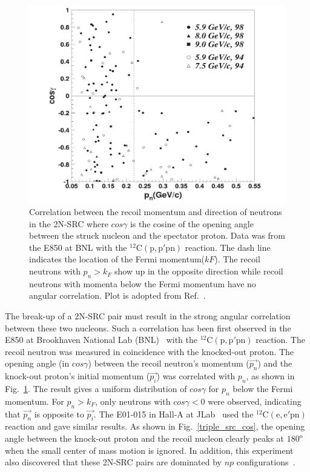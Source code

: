 \begin{figure}[!ht]
  \begin{center}
    \includegraphics[type=pdf,ext=.pdf,read=.pdf,width=0.65\linewidth]{./figures/physics/2NSRC_Angle}
    \caption[Correlation between the recoil momentum and direction of neutrons in the 2N-SRC]{\footnotesize{Correlation between the recoil momentum and direction of neutrons in the 2N-SRC where $cos\gamma$ is the cosine of the opening angle between the struck nucleon and the spectator proton. Data was from the E850 at BNL with the $\mathrm{^{12}C(p,p'pn)}$ reaction. The dash line indicates the location of the Fermi momentum($k{F}$). The recoil neutrons with $p_{n}>k_{F}$ show up in the opposite direction while recoil neutrons with momenta below the Fermi momentum have no angular correlation. Plot is adopted from Ref.~\cite{PhysRevLett.90.042301}.}}
    \label{bnl_cos}
  \end{center}
\end{figure}  
 The break-up of a 2N-SRC pair must result in the strong angular correlation between these two nucleons. Such a correlation has been first observed in the E850 at Brookhaven National Lab (BNL)~\cite{PhysRevLett.90.042301} with the $\mathrm{^{12}C(p,p'pn)}$ reaction. The recoil neutron was measured in coincidence with the knocked-out proton. The opening angle (in $cos\gamma$) between the recoil neutron's momentum ($\vec{p_{n}}$) and the knock-out proton's initial momentum ($\vec{p_{i}}$) was correlated with $p_{n}$, as shown in Fig.~\ref{bnl_cos}. The result gives a uniform distribution of $cos\gamma$ for $p_{n}$ below the Fermi momentum. For $p_{n}>k_{F}$, only neutrons with $cos\gamma<0$ were observed, indicating that $\vec{p_{n}}$ is opposite to $\vec{p_{i}}$. The E01-015 in Hall-A at JLab~\cite{PhysRevLett.99.072501} used the $\mathrm{^{12}C(e,e'pn)}$ reaction and gave similar results. As shown in Fig.~\ref{triple_src_cos}, the opening angle between the knock-out proton and the recoil nucleon clearly peaks at $\mathrm{180^{o}}$ when the small center of mass motion is ignored. In addition, this experiment also discovered that these 2N-SRC pairs are dominated by $np$ configurations~\cite{Subedi:2008zz}.
